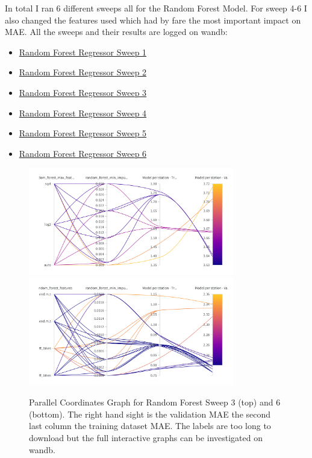 \documentclass[a4paper]{article}
\begin{document}
    In total I ran 6 different sweeps all for the Random Forest Model. For sweep 4-6 I also changed the features used which
    had by fare the most important impact on MAE. All the sweeps and their results are logged on wandb:
    \begin{itemize}
        \item \href{https://wandb.ai/idegen/mlp-2021/sweeps/ylvvcigm?workspace=user-idegen}{Random Forest Regressor Sweep 1}
        \item \href{https://wandb.ai/idegen/mlp-2021/sweeps/79bi8rgn?workspace=user-idegen}{Random Forest Regressor Sweep 2}
        \item \href{https://wandb.ai/idegen/mlp-2021/sweeps/42mzcyb3?workspace=user-idegen}{Random Forest Regressor Sweep 3}
        \item \href{https://wandb.ai/idegen/mlp-2021/sweeps/rrpaocle?workspace=user-idegen}{Random Forest Regressor Sweep 4}
        \item \href{https://wandb.ai/idegen/mlp-2021/sweeps/au3spnyx?workspace=user-idegen}{Random Forest Regressor Sweep 5}
        \item \href{https://wandb.ai/idegen/mlp-2021/sweeps/lc68mqc3?workspace=user-idegen}{Random Forest Regressor Sweep 6}
    \end{itemize}

    \begin{figure}[h]
        \centering
        \includegraphics[width=0.8\textwidth]{randomforest-sweep3}
        \includegraphics[width=0.8\textwidth]{random-forest-sweep6}
        \caption{Parallel Coordinates Graph for Random Forest Sweep 3 (top) and 6 (bottom). The right hand sight is the
        validation MAE the second last column the training dataset MAE. The labels are too long to download but the
        full interactive graphs can be investigated on wandb.}
        \label{fig:sweep3and6RandomForest}
    \end{figure}
\end{document}
